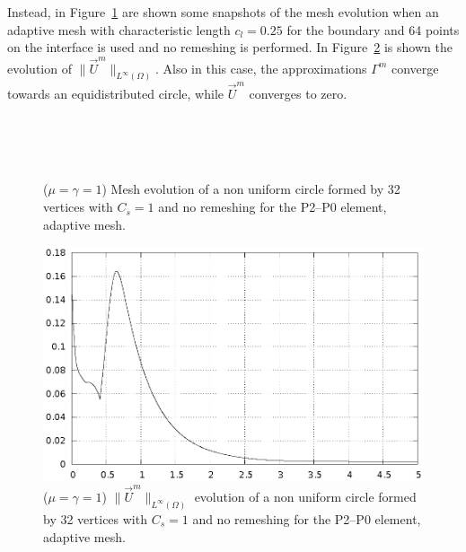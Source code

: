 \documentclass[a4paper,12pt,onecolumn]{article}
\begin{document}
Instead, in Figure~\ref{fig:nonuniform_bubble_64_coarse_smooth} are shown some
snapshots of the mesh evolution when an adaptive mesh with characteristic length
$c_l=0.25$ for the boundary and 64 points on the interface is used and no
remeshing is performed. In
Figure~\ref{fig:nonuniform_bubble_velocity_64_coarse_smooth} is shown the
evolution of $\|\vec U^m\|_{L^\infty(\Omega)}$. Also in this case, the
approximations $\Gamma^m$ converge towards an equidistributed circle, while
$\vec U^m$ converges to zero.
\begin{figure}[htbp]
  \centering
  \\
  \quad
  \\
  \quad
  \\
  \caption{($\mu=\gamma=1$) Mesh evolution of a non uniform circle formed by
32 vertices with $C_s=1$ and no remeshing for the P2--P0 element, adaptive
mesh.}
  \label{fig:nonuniform_bubble_64_coarse_smooth}
\end{figure}

\begin{figure}[htbp]
  \centering
  \includegraphics[width=.45\textwidth]
  {figures/nonuniform_bubble_velocity_64_coarse_smooth.ps}
  \caption{($\mu=\gamma=1$) $\|\vec U^m\|_{L^\infty(\Omega)}$ evolution of a
non uniform circle formed by 32 vertices with $C_s=1$ and no remeshing for the
P2--P0 element, adaptive mesh.}
  \label{fig:nonuniform_bubble_velocity_64_coarse_smooth}
\end{figure}
\end{document}
